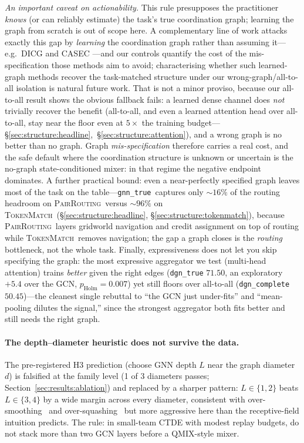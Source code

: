 \documentclass[10pt]{article}
\newcommand{\algoname}[1]{\textsc{#1}}
\newcommand{\gtrue}{\texttt{gnn\_true}}
\newcommand{\pairrouting}{\textsc{PairRouting}}
\newcommand{\tokenmatch}{\textsc{TokenMatch}}
\begin{document}
\emph{An important caveat on actionability.} This rule presupposes the
practitioner \emph{knows} (or can reliably estimate) the task's true
coordination graph; learning the graph from scratch is out of scope here. A
complementary line of work attacks exactly this gap by \emph{learning} the
coordination graph rather than assuming it---e.g.\ \algoname{DICG}
\citep{li_2021_dicg} and \algoname{CASEC} \citep{wang_2022_casec}---and our
controls quantify the cost of the mis-specification those methods aim to avoid;
characterising whether such learned-graph methods recover the task-matched
structure under our wrong-graph/all-to-all isolation is natural future work. That
is not a minor proviso, because our all-to-all result shows the obvious
fallback fails: a learned dense channel does \emph{not} trivially recover the
benefit (all-to-all, and even a learned attention head over all-to-all, stay
near the floor even at $5\times$ the training
budget---\S\ref{sec:structure:headline},~\S\ref{sec:structure:attention}),
and a wrong graph is no better than no graph. Graph \emph{mis-specification}
therefore carries a real cost, and the safe default where the coordination
structure is unknown or uncertain is the no-graph state-conditioned mixer: in
that regime the negative endpoint dominates. A further practical bound: even a
near-perfectly specified graph leaves most of the task on the table---\gtrue\
captures only ${\sim}16\%$ of the routing headroom on \pairrouting\ versus
${\sim}96\%$ on \tokenmatch\ (\S\ref{sec:structure:headline},
\S\ref{sec:structure:tokenmatch}), because \pairrouting\ layers gridworld
navigation and credit assignment on top of routing while \tokenmatch\ removes
navigation; the gap a graph closes is the \emph{routing} bottleneck, not the
whole task. Finally, expressiveness does not let you skip specifying the graph:
the most expressive aggregator we test (multi-head attention) trains
\emph{better} given the right edges (\texttt{dgn\_true} $71.50$, an
exploratory $+5.4$ over the GCN, $p_{\text{Holm}}=0.007$) yet still floors
over all-to-all
(\texttt{dgn\_complete} $50.45$)---the cleanest single rebuttal to ``the GCN
just under-fits'' and ``mean-pooling dilutes the signal,'' since the strongest
aggregator both fits better and still needs the right graph.

\paragraph{The depth--diameter heuristic does not survive the data.} The
pre-registered H3 prediction (choose GNN depth $L$ near the graph
diameter $d$) is falsified at the family level (1 of 3 diameters passes;
Section~\ref{sec:results:ablation}) and replaced by a sharper pattern:
$L\in\{1,2\}$ beats $L\in\{3,4\}$ by a wide margin across every diameter,
consistent with over-smoothing~\citep{li_2018_oversmoothing} and
over-squashing~\citep{alon_2021_oversquashing} but more aggressive here than the
receptive-field intuition predicts. The rule: in small-team CTDE with
modest replay budgets, do not stack more than two GCN layers before a
QMIX-style mixer.
\end{document}
